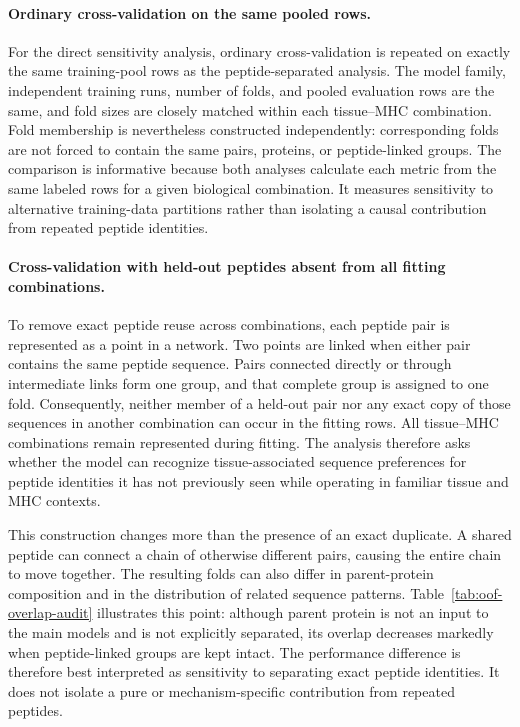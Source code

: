 \paragraph{Ordinary cross-validation on the same pooled rows.}
For the direct sensitivity analysis, ordinary cross-validation is repeated on exactly the same training-pool rows as the peptide-separated analysis. The model family, independent training runs, number of folds, and pooled evaluation rows are the same, and fold sizes are closely matched within each tissue--MHC combination. Fold membership is nevertheless constructed independently: corresponding folds are not forced to contain the same pairs, proteins, or peptide-linked groups. The comparison is informative because both analyses calculate each metric from the same labeled rows for a given biological combination. It measures sensitivity to alternative training-data partitions rather than isolating a causal contribution from repeated peptide identities.

\paragraph{Cross-validation with held-out peptides absent from all fitting combinations.}
To remove exact peptide reuse across combinations, each peptide pair is represented as a point in a network. Two points are linked when either pair contains the same peptide sequence. Pairs connected directly or through intermediate links form one group, and that complete group is assigned to one fold. Consequently, neither member of a held-out pair nor any exact copy of those sequences in another combination can occur in the fitting rows. All tissue--MHC combinations remain represented during fitting. The analysis therefore asks whether the model can recognize tissue-associated sequence preferences for peptide identities it has not previously seen while operating in familiar tissue and MHC contexts.

This construction changes more than the presence of an exact duplicate. A shared peptide can connect a chain of otherwise different pairs, causing the entire chain to move together. The resulting folds can also differ in parent-protein composition and in the distribution of related sequence patterns. Table~\ref{tab:oof-overlap-audit} illustrates this point: although parent protein is not an input to the main models and is not explicitly separated, its overlap decreases markedly when peptide-linked groups are kept intact. The performance difference is therefore best interpreted as sensitivity to separating exact peptide identities. It does not isolate a pure or mechanism-specific contribution from repeated peptides.

